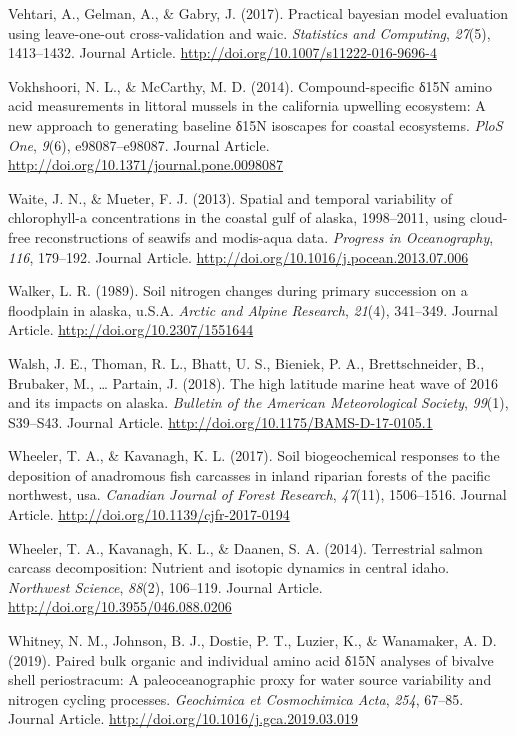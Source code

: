 \documentclass [11pt, proquest] {uwthesis}[2015/03/03]
\begin{document}
\hypertarget{ref-Vehtari2017}{}
Vehtari, A., Gelman, A., \& Gabry, J. (2017). Practical bayesian model
evaluation using leave-one-out cross-validation and waic.
\emph{Statistics and Computing}, \emph{27}(5), 1413--1432. Journal
Article. \url{http://doi.org/10.1007/s11222-016-9696-4}

\hypertarget{ref-Vokshoori2014}{}
Vokhshoori, N. L., \& McCarthy, M. D. (2014). Compound-specific δ15N
amino acid measurements in littoral mussels in the california upwelling
ecosystem: A new approach to generating baseline δ15N isoscapes for
coastal ecosystems. \emph{PloS One}, \emph{9}(6), e98087--e98087.
Journal Article. \url{http://doi.org/10.1371/journal.pone.0098087}

\hypertarget{ref-Waite2013}{}
Waite, J. N., \& Mueter, F. J. (2013). Spatial and temporal variability
of chlorophyll-a concentrations in the coastal gulf of alaska,
1998--2011, using cloud-free reconstructions of seawifs and modis-aqua
data. \emph{Progress in Oceanography}, \emph{116}, 179--192. Journal
Article. \url{http://doi.org/10.1016/j.pocean.2013.07.006}

\hypertarget{ref-Walker1989}{}
Walker, L. R. (1989). Soil nitrogen changes during primary succession on
a floodplain in alaska, u.S.A. \emph{Arctic and Alpine Research},
\emph{21}(4), 341--349. Journal Article.
\url{http://doi.org/10.2307/1551644}

\hypertarget{ref-Walsh2018}{}
Walsh, J. E., Thoman, R. L., Bhatt, U. S., Bieniek, P. A.,
Brettschneider, B., Brubaker, M., \ldots{} Partain, J. (2018). The high
latitude marine heat wave of 2016 and its impacts on alaska.
\emph{Bulletin of the American Meteorological Society}, \emph{99}(1),
S39--S43. Journal Article. \url{http://doi.org/10.1175/BAMS-D-17-0105.1}

\hypertarget{ref-Wheeler2017}{}
Wheeler, T. A., \& Kavanagh, K. L. (2017). Soil biogeochemical responses
to the deposition of anadromous fish carcasses in inland riparian
forests of the pacific northwest, usa. \emph{Canadian Journal of Forest
Research}, \emph{47}(11), 1506--1516. Journal Article.
\url{http://doi.org/10.1139/cjfr-2017-0194}

\hypertarget{ref-Wheeler2014}{}
Wheeler, T. A., Kavanagh, K. L., \& Daanen, S. A. (2014). Terrestrial
salmon carcass decomposition: Nutrient and isotopic dynamics in central
idaho. \emph{Northwest Science}, \emph{88}(2), 106--119. Journal
Article. \url{http://doi.org/10.3955/046.088.0206}

\hypertarget{ref-Whitney2019}{}
Whitney, N. M., Johnson, B. J., Dostie, P. T., Luzier, K., \& Wanamaker,
A. D. (2019). Paired bulk organic and individual amino acid δ15N
analyses of bivalve shell periostracum: A paleoceanographic proxy for
water source variability and nitrogen cycling processes.
\emph{Geochimica et Cosmochimica Acta}, \emph{254}, 67--85. Journal
Article. \url{http://doi.org/10.1016/j.gca.2019.03.019}
\end{document}

